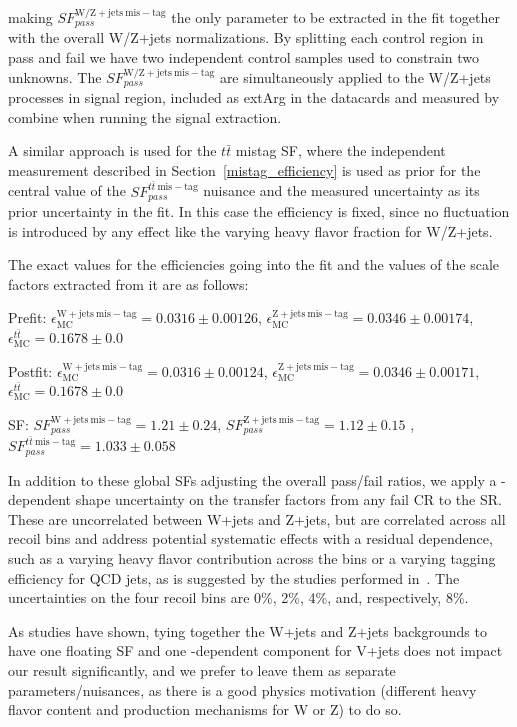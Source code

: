 making $SF^{\mathrm{W/Z+jets~mis-tag}}_{pass}$ the only parameter to be extracted in the fit together with the overall W/Z+jets normalizations. By splitting each control region in pass and fail we have two independent control samples used to constrain two unknowns. The $SF^{\mathrm{W/Z+jets~mis-tag}}_{pass}$ are simultaneously applied to the W/Z+jets processes in signal region, included as extArg in the datacards and measured by combine when running the signal extraction. 

A similar approach is used for the $t\bar{t}$ mistag SF, where the independent measurement described in Section~\ref{mistag_efficiency} is used as prior for the central value of the $SF^{t\bar{t}\mathrm{~mis-tag}}_{pass}$ nuisance and the measured uncertainty as its prior uncertainty in the fit. In this case the efficiency is fixed, since no fluctuation is introduced by any effect like the varying heavy flavor fraction for W/Z+jets.

The exact values for the efficiencies going into the fit and the values of the scale factors extracted from it are as follows: 

Prefit: $\epsilon^{\mathrm{W+jets~mis-tag}}_{\mathrm{MC}}=0.0316\pm 0.00126$, $\epsilon^{\mathrm{Z+jets~mis-tag}}_{\mathrm{MC}}=0.0346\pm 0.00174$, $\epsilon^{t\bar{t}}_{\mathrm{MC}}=0.1678\pm 0.0$

Postfit: $\epsilon^{\mathrm{W+jets~mis-tag}}_{\mathrm{MC}}=0.0316\pm 0.00124$, $\epsilon^{\mathrm{Z+jets~mis-tag}}_{\mathrm{MC}}=0.0346\pm 0.00171$, $\epsilon^{t\bar{t}}_{\mathrm{MC}}=0.1678\pm 0.0$

SF: $SF^{\mathrm{W+jets~mis-tag}}_{pass}=1.21\pm0.24$, $SF^{\mathrm{Z+jets~mis-tag}}_{pass}=1.12\pm0.15$ ,$SF^{t\bar{t}~\mathrm{mis-tag}}_{pass}=1.033\pm0.058$


In addition to these global SFs adjusting the overall pass/fail ratios, we apply a \pt-dependent shape uncertainty on the transfer factors from any fail CR to the SR. These are uncorrelated between W+jets and Z+jets, but are correlated across all recoil bins and address potential systematic effects with a residual \pt dependence, such as a varying heavy flavor contribution across the bins or a varying tagging efficiency for QCD jets, as is suggested by the studies performed in~\cite{boostedhiggs}. The uncertainties on the four recoil bins are 0\%, 2\%, 4\%, and, respectively, 8\%.

As studies have shown, tying together the W+jets and Z+jets backgrounds to have one floating SF and one \pt-dependent component for V+jets does not impact our result significantly, and we prefer to leave them as separate parameters/nuisances, as there is a good physics motivation (different heavy flavor content and production mechanisms for W or Z) to do so.


